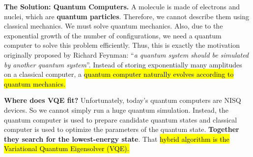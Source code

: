 \highspace
\textcolor{Green3}{ \textbf{The Solution: Quantum Computers.}} A molecule is made of electrons and nuclei, which are \textbf{quantum particles}. Therefore, we cannot describe them using classical mechanics. We must solve quantum mechanics. Also, due to the exponential growth of the number of configurations, we need a quantum computer to solve this problem efficiently. Thus, this is exactly the motivation originally proposed by Richard Feynman: ``\emph{a quantum system should be simulated by another quantum system}''. Instead of storing exponentially many amplitudes on a classical computer, a \hl{quantum computer naturally evolves according to quantum mechanics.}

\highspace
\textcolor{Green3}{ \textbf{Where does VQE fit?}} Unfortunately, today's quantum computers are NISQ devices. So we cannot simply run a huge quantum simulation. Instead, the quantum computer is used to prepare candidate quantum states and classical computer is used to optimize the parameters of the quantum state. \textbf{Together they search for the lowest-energy state}. That \hl{hybrid algorithm is the Variational Quantum Eigensolver (VQE).}